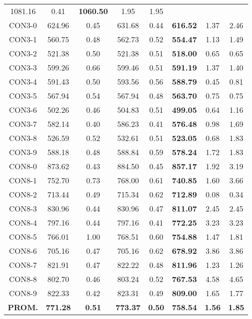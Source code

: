 \begin{table}[ht]
\begin{tabular}{c c c c c c c c}
1081.16 & 0.41 & \bf{1060.50} & 
1.95 & 1.95\\CON3-0 & 624.96 & 0.45 & 
631.68 & 0.44 & \bf{616.52} & 
1.37 & 2.46\\CON3-1 & 560.75 & 0.48 & 
562.73 & 0.52 & \bf{554.47} & 
1.13 & 1.49\\CON3-2 & 521.38 & 0.50 & 
521.38 & 0.51 & \bf{518.00} & 
0.65 & 0.65\\CON3-3 & 599.26 & 0.66 & 
599.46 & 0.51 & \bf{591.19} & 
1.37 & 1.40\\CON3-4 & 591.43 & 0.50 & 
593.56 & 0.56 & \bf{588.79} & 
0.45 & 0.81\\CON3-5 & 567.94 & 0.54 & 
567.94 & 0.48 & \bf{563.70} & 
0.75 & 0.75\\CON3-6 & 502.26 & 0.46 & 
504.83 & 0.51 & \bf{499.05} & 
0.64 & 1.16\\CON3-7 & 582.14 & 0.40 & 
586.23 & 0.41 & \bf{576.48} & 
0.98 & 1.69\\CON3-8 & 526.59 & 0.52 & 
532.61 & 0.51 & \bf{523.05} & 
0.68 & 1.83\\CON3-9 & 588.18 & 0.48 & 
588.84 & 0.59 & \bf{578.24} & 
1.72 & 1.83\\CON8-0 & 873.62 & 0.43 & 
884.50 & 0.45 & \bf{857.17} & 
1.92 & 3.19\\CON8-1 & 752.70 & 0.73 & 
768.00 & 0.61 & \bf{740.85} & 
1.60 & 3.66\\CON8-2 & 713.44 & 0.49 & 
715.34 & 0.62 & \bf{712.89} & 
0.08 & 0.34\\CON8-3 & 830.96 & 0.44 & 
830.96 & 0.47 & \bf{811.07} & 
2.45 & 2.45\\CON8-4 & 797.16 & 0.44 & 
797.16 & 0.41 & \bf{772.25} & 
3.23 & 3.23\\CON8-5 & 766.01 & 1.00 & 
768.51 & 0.60 & \bf{754.88} & 
1.47 & 1.81\\CON8-6 & 705.16 & 0.47 & 
705.16 & 0.62 & \bf{678.92} & 
3.86 & 3.86\\CON8-7 & 821.91 & 0.47 & 
822.22 & 0.48 & \bf{811.96} & 
1.23 & 1.26\\CON8-8 & 802.70 & 0.46 & 
803.24 & 0.52 & \bf{767.53} & 
4.58 & 4.65\\CON8-9 & 822.33 & 0.42 & 
823.31 & 0.49 & \bf{809.00} & 
1.65 & 1.77\\\bf{PROM.} & 
\bf{771.28} & \bf{0.51} & \bf{773.37} & \bf{0.50} & \bf{758.54} & \bf{1.56} & \bf{1.85}\\[1ex]\hline
\end{tabular}
\label{table:nonlin}
\end{table} 
\clearpage

